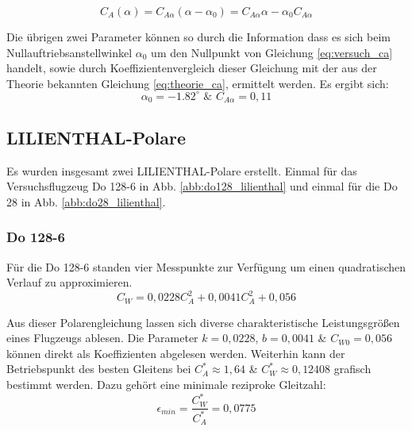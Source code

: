 \begin{equation}  \label{eq:theorie_ca}
C_A(\alpha) = C_{A\alpha}(\alpha - \alpha_0)=C_{A\alpha}\alpha - \alpha_0 C_{A\alpha}
\end{equation}

\vspace{3mm} \noindent
Die übrigen zwei Parameter können so durch die Information dass es sich beim Nullauftriebsanstellwinkel $\alpha_0$ um den Nullpunkt von Gleichung \ref{eq:versuch_ca} handelt, sowie durch Koeffizientenvergleich dieser Gleichung mit der aus der Theorie bekannten Gleichung \ref{eq:theorie_ca}, ermittelt werden. Es ergibt sich:\\

\begin{equation*}
	\alpha_0=-1.82 ^\circ \,\, \& \,\, C_{A\alpha}= 0,11
\end{equation*}

\vspace{5mm} \noindent

\subsection{LILIENTHAL-Polare}
Es wurden insgesamt zwei LILIENTHAL-Polare erstellt. Einmal für das Versuchsflugzeug Do 128-6 in Abb. \ref{abb:do128_lilienthal} und einmal für die Do 28 in Abb. \ref{abb:do28_lilienthal}.\\
\subsubsection{Do 128-6}
Für die Do 128-6 standen vier Messpunkte zur Verfügung um einen quadratischen Verlauf zu approximieren.\\

\begin{equation}
C_W=0,0228 C_A^2 + 0,0041 C_A^2+ 0,056
\end{equation}

\vspace{3mm} \noindent
Aus dieser Polarengleichung lassen sich diverse charakteristische Leistungsgrößen eines Flugzeugs ablesen. Die Parameter $k=0,0228$, $b=0,0041$ \& $C_{W0}=0,056$ können direkt als Koeffizienten abgelesen werden. Weiterhin kann der Betriebspunkt des besten Gleitens bei $C_{A}^* \approx 1,64$ \& $C_{W}^*\approx 0,12408$ grafisch bestimmt werden. Dazu gehört eine minimale reziproke Gleitzahl:\\

\begin{equation}
\epsilon_{min}=\frac{C_W^*}{C_A^*}=0,0775
\end{equation}

